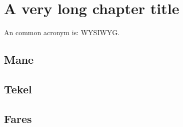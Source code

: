 
\chapter{A very long chapter title}
\label{cap:three}

An common acronym is: \ac{WYSIWYG}.

\lipsum[1]

\section{Mane}
\lipsum[2]

\section{Tekel}
\lipsum[3]

\section{Fares}
\lipsum[4-5]
